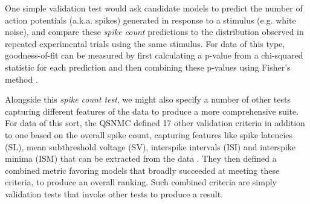 \documentclass{frontiersSCNS}
\begin{document}
One simple validation test would ask candidate models to predict the number of action potentials (a.k.a. spikes) generated in response to a stimulus (e.g. white noise), and compare these \emph{spike count} predictions to the distribution observed in repeated experimental trials using the same stimulus. 
For data of this type, goodness-of-fit can be measured by first calculating a p-value from a chi-squared statistic for each prediction and then combining these p-values using Fisher's method \citep{fisher_statistical_1925}. 

Alongside this \emph{spike count test}, we might also specify a number of other tests capturing different features of the data  to produce a more comprehensive suite. 
For data of this sort, the QSNMC defined 17 other validation criteria in addition to one based on the overall spike count, capturing features like spike latencies (SL), mean subthreshold voltage (SV), interspike intervals (ISI) and interspike minima (ISM) that can be extracted from the data \citep{jolivet_quantitative_2008}. 
They then defined a combined metric favoring models that broadly succeeded at meeting these criteria, to produce an overall ranking. 
Such combined criteria are simply validation tests that invoke other tests to produce a result.
 
\end{document}
